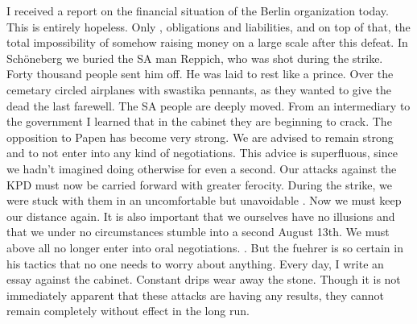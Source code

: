 
I received a report on the financial situation of the Berlin organization today. This is entirely hopeless. Only , obligations and liabilities, and on top of that, the total impossibility of somehow raising money on a large scale after this defeat. In Schöneberg we buried the SA man Reppich, who was shot during the strike. Forty thousand people sent him off. He was laid to rest like a prince. Over the cemetary circled airplanes with swastika pennants, as they wanted to give the dead the last farewell. The SA people are deeply moved. From an intermediary to the government I learned that in the cabinet they are beginning to  crack. The opposition to Papen has become very strong. We are advised to remain strong and to not enter into any kind of negotiations. This advice is superfluous, since we hadn't imagined doing otherwise for even a second. Our attacks against the KPD must now be carried forward with greater ferocity. During the strike, we were stuck with them in an uncomfortable but unavoidable . Now we must keep our distance again. It is also important that we ourselves have no illusions and that we under no circumstances stumble into a second August 13th. We must above all no longer enter into oral negotiations. . But the fuehrer is so certain in his tactics that no one needs to worry about anything. Every day, I write an essay against the cabinet. Constant drips wear away the stone. Though it is not immediately apparent that these attacks are having any results, they cannot remain completely without effect in the long run.
